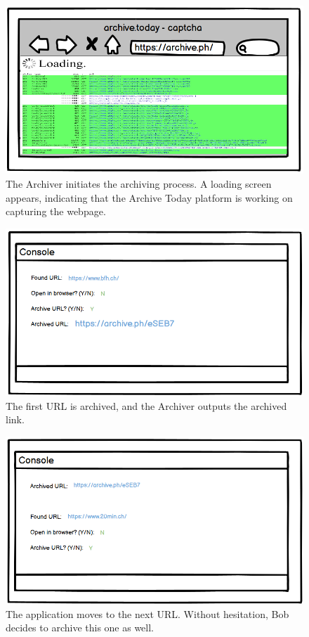 \begin{figure}[h!]
    \centering
    \includegraphics[width=1\textwidth]{pictures/Story Board/StoryBoard_4}
    \caption{The Archiver initiates the archiving process. A loading screen appears, indicating that the Archive Today platform is working on capturing the webpage.}
    \label{fig:StoryBoard_4}
\end{figure}
\begin{figure}[h!]
    \centering
    \includegraphics[width=1\textwidth]{pictures/Story Board/StoryBoard_5}
    \caption{The first URL is archived, and the Archiver outputs the archived link.}
    \label{fig:StoryBoard_5}
\end{figure}
\begin{figure}[h!]
    \centering
    \includegraphics[width=1\textwidth]{pictures/Story Board/StoryBoard_6}
    \caption{The application moves to the next URL. Without hesitation, Bob decides to archive this one as well.}
    \label{fig:StoryBoard_6}
\end{figure}
\clearpage

